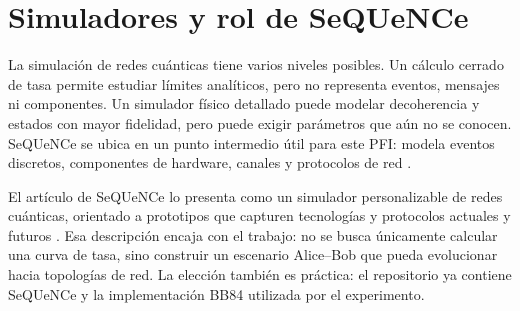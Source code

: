 \section{Simuladores y rol de SeQUeNCe}

La simulación de redes cuánticas tiene varios niveles posibles. Un cálculo cerrado de tasa permite estudiar límites analíticos, pero no representa eventos, mensajes ni componentes. Un simulador físico detallado puede modelar decoherencia y estados con mayor fidelidad, pero puede exigir parámetros que aún no se conocen. SeQUeNCe se ubica en un punto intermedio útil para este PFI: modela eventos discretos, componentes de hardware, canales y protocolos de red \cite{wu2021sequence}.

\enlargethispage{\baselineskip}
El artículo de SeQUeNCe lo presenta como un simulador personalizable de redes cuánticas, orientado a prototipos que capturen tecnologías y protocolos actuales y futuros \cite{wu2021sequence}. Esa descripción encaja con el trabajo: no se busca únicamente calcular una curva de tasa, sino construir un escenario Alice--Bob que pueda evolucionar hacia topologías de red. La elección también es práctica: el repositorio ya contiene SeQUeNCe y la implementación BB84 utilizada por el experimento.
